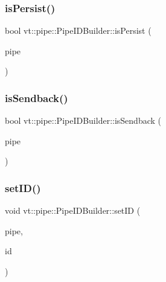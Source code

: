 \subsubsection{\texorpdfstring{is\+Persist()}{isPersist()}}
{\footnotesize\ttfamily bool vt\+::pipe\+::\+Pipe\+I\+D\+Builder\+::is\+Persist (\begin{DoxyParamCaption}\item[{\hyperlink{namespacevt_ac9852acda74d1896f48f406cd72c7bd3}{Pipe\+Type} const \&}]{pipe }\end{DoxyParamCaption})\hspace{0.3cm}{\ttfamily [static]}}

\mbox{\label{structvt_1_1pipe_1_1_pipe_i_d_builder_a5abea1b337eddd3c4958d563f69ee134}} 
\subsubsection{\texorpdfstring{is\+Sendback()}{isSendback()}}
{\footnotesize\ttfamily bool vt\+::pipe\+::\+Pipe\+I\+D\+Builder\+::is\+Sendback (\begin{DoxyParamCaption}\item[{\hyperlink{namespacevt_ac9852acda74d1896f48f406cd72c7bd3}{Pipe\+Type} const \&}]{pipe }\end{DoxyParamCaption})\hspace{0.3cm}{\ttfamily [static]}}

\mbox{\label{structvt_1_1pipe_1_1_pipe_i_d_builder_a47d32ec9891e61c47eb96edc10db1e12}} 
\subsubsection{\texorpdfstring{set\+I\+D()}{setID()}}
{\footnotesize\ttfamily void vt\+::pipe\+::\+Pipe\+I\+D\+Builder\+::set\+ID (\begin{DoxyParamCaption}\item[{\hyperlink{namespacevt_ac9852acda74d1896f48f406cd72c7bd3}{Pipe\+Type} \&}]{pipe,  }\item[{\hyperlink{namespacevt_1_1pipe_a8aa7908de242917ac0922b9e9c85fea4}{Pipe\+I\+D\+Type} const \&}]{id }\end{DoxyParamCaption})\hspace{0.3cm}{\ttfamily [static]}}

